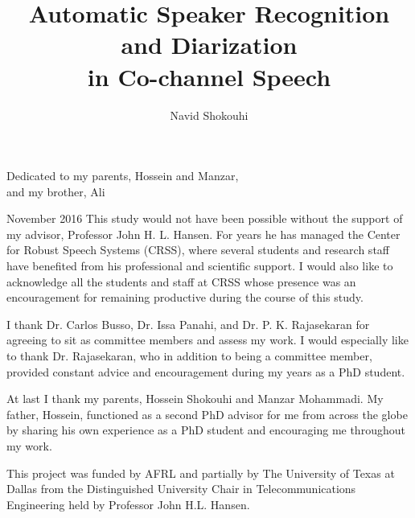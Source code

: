 \documentclass[doublespacing]{utdthesis}
\author{Navid Shokouhi}
\title{Automatic Speaker Recognition and Diarization \\
	in Co-channel Speech}
\begin{document}
\frontmatter

\signaturepage
{} %

\begin{dedication} %
Dedicated to my parents, Hossein and Manzar, \\ 
and my brother, Ali \\
\end{dedication}

\maketitle

\begin{acks}{November 2016} %
	This study would not have been possible without the support of my advisor, Professor John H. L. Hansen. 
	For years he has managed the Center for Robust Speech Systems (CRSS), where several students and research staff have benefited from his professional and scientific support. 
	I would also like to acknowledge all the students and staff at CRSS whose presence was an encouragement for remaining productive during the course of this study. 
	
	I thank Dr. Carlos Busso, Dr. Issa Panahi, and Dr. P. K. Rajasekaran for agreeing to sit as committee members and assess my work. 
	I would especially like to thank Dr. Rajasekaran, who in addition to being a committee member, provided constant advice and encouragement during my years as a PhD student. 
	
	At last I thank my parents, Hossein Shokouhi and Manzar Mohammadi. 
	My father, Hossein, functioned as a second PhD advisor for me from across the globe by sharing his own experience as a PhD student and encouraging me throughout my work. 
	
	This project was funded by AFRL and partially by The University of Texas at Dallas from the Distinguished University Chair in Telecommunications Engineering held by Professor John H.L. Hansen.

\end{acks}
\end{document}
